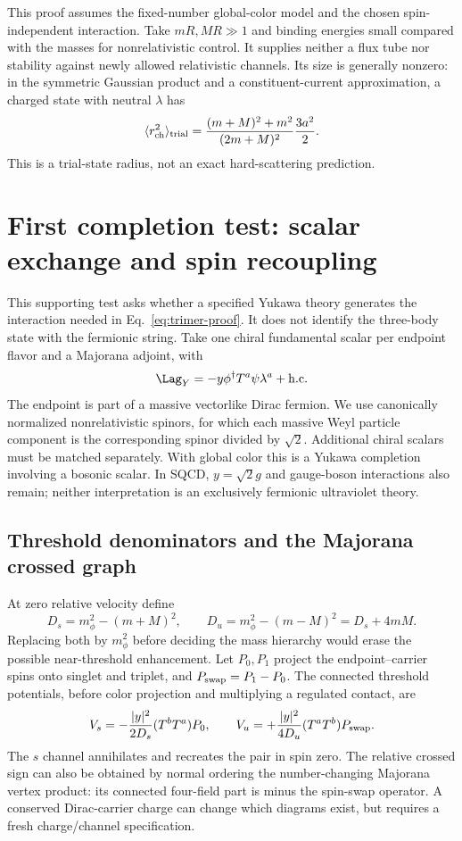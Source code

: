 This proof assumes the fixed-number global-color model and the chosen spin-independent interaction. Take $mR,MR\gg1$ and binding energies small compared with the masses for nonrelativistic control. It supplies neither a flux tube nor stability against newly allowed relativistic channels. Its size is generally nonzero: in the symmetric Gaussian product and a constituent-current approximation, a charged state with neutral $\lambda$ has
\begin{equation}
 \langle r_{\rm ch}^2\rangle_{\rm trial}
 =\frac{(m+M)^2+m^2}{(2m+M)^2}\frac{3a^2}{2}.
\end{equation}
This is a trial-state radius, not an exact hard-scattering prediction.

\section{First completion test: scalar exchange and spin recoupling}
\label{sec:completion}
This supporting test asks whether a specified Yukawa theory generates the interaction needed in Eq.~\eqref{eq:trimer-proof}. It does not identify the three-body state with the fermionic string. Take one chiral fundamental scalar per endpoint flavor and a Majorana adjoint, with
\begin{equation}
 \Lag_Y=-y\phi^\dagger T^a\psi\lambda^a+\mathrm{h.c.}
 \label{eq:squark-yukawa}
\end{equation}
The endpoint is part of a massive vectorlike Dirac fermion. We use canonically normalized nonrelativistic spinors, for which each massive Weyl particle component is the corresponding spinor divided by $\sqrt2$. Additional chiral scalars must be matched separately. With global color this is a Yukawa completion involving a bosonic scalar. In SQCD, $y=\sqrt2g$ and gauge-boson interactions also remain; neither interpretation is an exclusively fermionic ultraviolet theory.

\subsection{Threshold denominators and the Majorana crossed graph}
At zero relative velocity define
\begin{equation}
 D_s=m_\phi^2-(m+M)^2,\qquad
 D_u=m_\phi^2-(m-M)^2=D_s+4mM.
\end{equation}
Replacing both by $m_\phi^2$ before deciding the mass hierarchy would erase the possible near-threshold enhancement. Let $P_0,P_1$ project the endpoint--carrier spins onto singlet and triplet, and $P_{\rm swap}=P_1-P_0$. The connected threshold potentials, before color projection and multiplying a regulated contact, are
\begin{equation}
 V_s=-\frac{|y|^2}{2D_s}(T^bT^a)P_0,\qquad
 V_u=+\frac{|y|^2}{4D_u}(T^aT^b)P_{\rm swap}.
\end{equation}
The $s$ channel annihilates and recreates the pair in spin zero. The relative crossed sign can also be obtained by normal ordering the number-changing Majorana vertex product: its connected four-field part is minus the spin-swap operator. A conserved Dirac-carrier charge can change which diagrams exist, but requires a fresh charge/channel specification.

